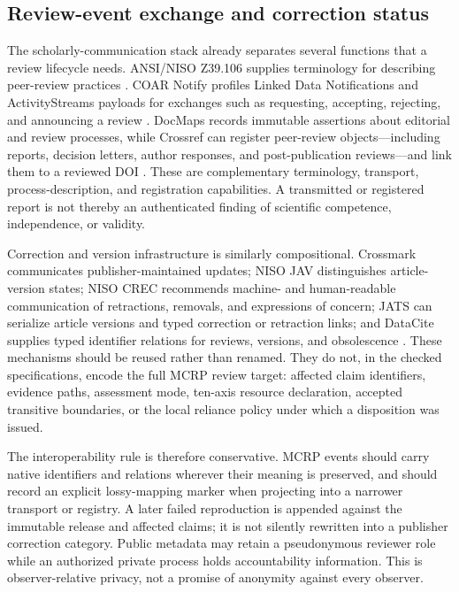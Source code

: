 \documentclass[11pt]{article}
\begin{document}
\subsection{Review-event exchange and correction status}

The scholarly-communication stack already separates several functions that a review lifecycle needs. ANSI/NISO Z39.106 supplies terminology for describing peer-review practices \citep{niso-peer-review-2023}. COAR Notify profiles Linked Data Notifications and ActivityStreams payloads for exchanges such as requesting, accepting, rejecting, and announcing a review \citep{coar-notify-1.0.1,hochstenbach-event-notifications-2022}. DocMaps records immutable assertions about editorial and review processes, while Crossref can register peer-review objects---including reports, decision letters, author responses, and post-publication reviews---and link them to a reviewed DOI \citep{docmaps-framework-2021,crossref-peer-review-2026}. These are complementary terminology, transport, process-description, and registration capabilities. A transmitted or registered report is not thereby an authenticated finding of scientific competence, independence, or validity.

Correction and version infrastructure is similarly compositional. Crossmark communicates publisher-maintained updates; NISO JAV distinguishes article-version states; NISO CREC recommends machine- and human-readable communication of retractions, removals, and expressions of concern; JATS can serialize article versions and typed correction or retraction links; and DataCite supplies typed identifier relations for reviews, versions, and obsolescence \citep{crossref-crossmark-2026,niso-jav-2008,niso-crec-2024,jats-1.4,datacite-schema-4.7}. These mechanisms should be reused rather than renamed. They do not, in the checked specifications, encode the full MCRP review target: affected claim identifiers, evidence paths, assessment mode, ten-axis resource declaration, accepted transitive boundaries, or the local reliance policy under which a disposition was issued.

The interoperability rule is therefore conservative. MCRP events should carry native identifiers and relations wherever their meaning is preserved, and should record an explicit lossy-mapping marker when projecting into a narrower transport or registry. A later failed reproduction is appended against the immutable release and affected claims; it is not silently rewritten into a publisher correction category. Public metadata may retain a pseudonymous reviewer role while an authorized private process holds accountability information. This is observer-relative privacy, not a promise of anonymity against every observer.
\end{document}
